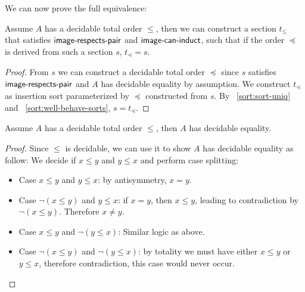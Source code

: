 We can now prove the full equivalence:
\begin{proposition}\label{sort:s2o2s}
    Assume $A$ has a decidable total order $\leq$, then we can construct
    a section $t_\leq$ that satisfies $\operatorname{\mathsf{image-respects-pair}}$ and $\operatorname{\mathsf{image-can-induct}}$,
    such that if the order $\preccurlyeq$ is derived from such a section $s$,
    $t_\preccurlyeq = s$.
\end{proposition}
\begin{proof}
    From $s$ we can construct a decidable total order $\preccurlyeq$ since $s$ satisfies
    $\operatorname{\mathsf{image-respects-pair}}$ and $A$ has decidable equality by assumption.
    We construct $t_\preccurlyeq$ as insertion sort
    parameterized by $\preccurlyeq$ constructed from $s$.
    By ~\cref{sort:sort-uniq} and ~\cref{sort:well-behave-sorts}, $s = t_\preccurlyeq$.
\end{proof}

\begin{proposition}\label{sort:decord-to-deceq}
    Assume $A$ has a decidable total order $\leq$,
    then $A$ has decidable equality.
\end{proposition}
\begin{proof}
    Since $\leq$ is decidable, we can use it to show $A$ has decidable equality as follow:
    We decide if $x \leq y$ and $y \leq x$ and perform case splitting:
    \begin{itemize}
        \item
              Case $x \leq y$ and $y \leq x$: by antisymmetry, $x = y$.
        \item
              Case $\neg(x \leq y)$ and $y \leq x$: if $x = y$, then $x \leq y$,
              leading to contradiction by $\neg(x \leq y)$. Therefore $x \neq y$.
        \item
              Case $x \leq y$ and $\neg(y \leq x)$: Similar logic as above.
        \item
              Case $\neg(x \leq y)$ and $\neg(y \leq x)$: by totality we must have either
              $x \leq y$ or $y \leq x$, therefore contradiction, this case would never occur.
    \end{itemize}
\end{proof}

